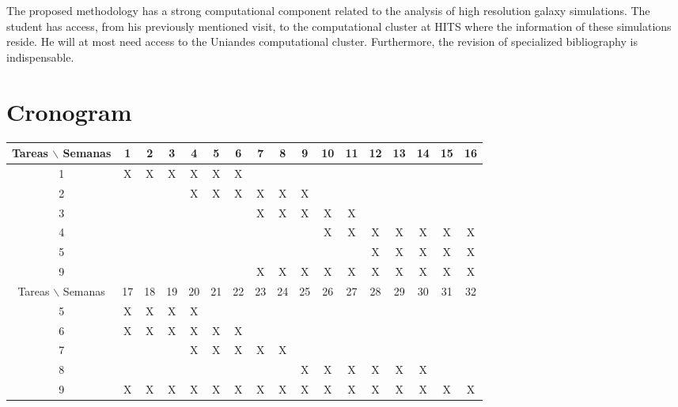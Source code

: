 \documentclass[12pt]{article}
\begin{document}
The proposed methodology has a strong computational component related to the analysis of high resolution galaxy simulations. 
The student has access, from his previously mentioned visit, to the computational cluster at HITS where the information of these simulations reside.
He will at most need access to the Uniandes computational cluster.
Furthermore, the revision of specialized bibliography is indispensable.\\


\section{Cronogram}

\begin{table}[htb]
	\begin{tabular}{|c|cccccccccccccccc| }
	\hline
	Tareas $\backslash$ Semanas & 1 & 2 & 3 & 4 & 5 & 6 & 7 & 8 & 9 & 10 & 11 & 12 & 13 & 14 & 15 & 16  \\
	\hline
	1 & X & X & X & X & X & X &   &   &   &   &   &   &   &   &   &   \\
	2 &   &   &   & X & X & X & X & X & X &   &   &   &   &   &   &   \\
	3 &   &   &   &   &   &   & X & X & X & X & X &   &   &   &   &   \\
	4 &   &   &   &   &   &   &   &   &   & X & X & X & X & X & X & X \\
	5 &   &   &   &   &   &   &   &   &   &   &   & X & X & X & X & X \\
	9 &   &   &   &   &   &   & X & X & X & X & X & X & X & X & X & X \\

	\hline
	Tareas $\backslash$ Semanas & 17 & 18 & 19 & 20 & 21 & 22 & 23 & 24 & 25 & 26 & 27 & 28 & 29 & 30 & 31 & 32  \\
	\hline
	5 & X & X & X & X &   &   &   &   &   &   &   &   &   &   &   &   \\
	6 & X & X & X & X & X & X &   &   &   &   &   &   &   &   &   &   \\
	7 &   &   &   & X & X & X & X & X &   &   &   &   &   &   &   &   \\
	8 &   &   &   &   &   &   &   &   & X & X & X & X & X & X &   &   \\
	9 & X & X & X & X & X & X & X & X & X & X & X & X & X & X & X & X \\


	\hline
	\end{tabular}
\end{table}
\vspace{1mm}
\end{document}
